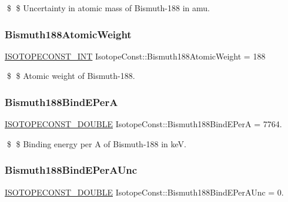 \$ \$ Uncertainty in atomic mass of Bismuth-\/188 in amu. \mbox{\label{group___isotope_const-_bismuth-_bi188_gadc90260b5cc508892985a4f38c474f19}} 
\subsubsection{\texorpdfstring{Bismuth188\+Atomic\+Weight}{Bismuth188AtomicWeight}}
{\footnotesize\ttfamily \mbox{\hyperlink{group___isotope_const-_macros_ga5f18360b3e99483a35c32d789e62621c}{I\+S\+O\+T\+O\+P\+E\+C\+O\+N\+S\+T\+\_\+\+I\+NT}} Isotope\+Const\+::\+Bismuth188\+Atomic\+Weight = 188}

\$ \$ Atomic weight of Bismuth-\/188. \mbox{\label{group___isotope_const-_bismuth-_bi188_gada93014c1d6a332f970020a6147cbdf3}} 
\subsubsection{\texorpdfstring{Bismuth188\+Bind\+E\+PerA}{Bismuth188BindEPerA}}
{\footnotesize\ttfamily \mbox{\hyperlink{group___isotope_const-_macros_ga8f45a7272ce02c0b4c65c44636ed719a}{I\+S\+O\+T\+O\+P\+E\+C\+O\+N\+S\+T\+\_\+\+D\+O\+U\+B\+LE}} Isotope\+Const\+::\+Bismuth188\+Bind\+E\+PerA = 7764.}

\$ \$ Binding energy per A of Bismuth-\/188 in keV. \mbox{\label{group___isotope_const-_bismuth-_bi188_gaf347aa33ceb07ce93e7c37cc3e0c27b9}} 
\subsubsection{\texorpdfstring{Bismuth188\+Bind\+E\+Per\+A\+Unc}{Bismuth188BindEPerAUnc}}
{\footnotesize\ttfamily \mbox{\hyperlink{group___isotope_const-_macros_ga8f45a7272ce02c0b4c65c44636ed719a}{I\+S\+O\+T\+O\+P\+E\+C\+O\+N\+S\+T\+\_\+\+D\+O\+U\+B\+LE}} Isotope\+Const\+::\+Bismuth188\+Bind\+E\+Per\+A\+Unc = 0.}

